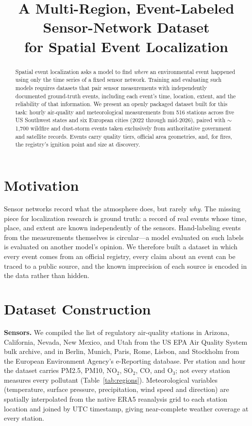 \documentclass[conference]{IEEEtran}
\begin{document}
\title{A Multi-Region, Event-Labeled Sensor-Network Dataset\\
for Spatial Event Localization}

\author{\IEEEauthorblockN{[Author 1], [Author 2], [Author 3], [Author 4]}
}

\maketitle

\begin{abstract}
Spatial event localization asks a model to find \emph{where} an
environmental event happened using only the time series of a fixed sensor
network. Training and evaluating such models requires datasets that pair
sensor measurements with independently documented ground-truth events,
including each event's time, location, extent, and the reliability of that
information. We present an openly packaged dataset built for this task:
hourly air-quality and meteorological measurements from 516 stations across
five US Southwest states and six European cities (2022 through mid-2026),
paired with $\sim$1,700 wildfire and dust-storm events taken exclusively
from authoritative government and satellite records. Events carry quality
tiers, official area geometries, and, for fires, the registry's ignition
point and size at discovery.
\end{abstract}

\section{Motivation}
Sensor networks record what the atmosphere does, but rarely \emph{why}.
The missing piece for localization research is ground truth:
a record of real events whose time, place, and extent are known
independently of the sensors. Hand-labeling events from the measurements
themselves is circular---a model evaluated on such labels is evaluated on
another model's opinion. We therefore built a dataset in which every event
comes from an official registry, every claim about an event can be traced
to a public source, and the known imprecision of each source is encoded in
the data rather than hidden.

\section{Dataset Construction}
\textbf{Sensors.} We compiled the list of regulatory air-quality stations
in Arizona, California, Nevada, New Mexico, and Utah from the US EPA Air
Quality System bulk archive, and in Berlin, Munich, Paris, Rome, Lisbon,
and Stockholm from the European Environment Agency's e-Reporting database.
Per station and hour the dataset carries PM2.5, PM10, NO$_2$, SO$_2$, CO,
and O$_3$; not every station measures every pollutant
(Table~\ref{tab:regions}). Meteorological variables (temperature, surface
pressure, precipitation, wind speed and direction) are spatially
interpolated from the native ERA5 reanalysis grid to each station location
and joined by UTC timestamp, giving near-complete weather coverage at
every station.
\end{document}
